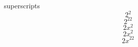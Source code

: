 \documentclass[11pt]{article}
\begin{document}
superscripts
$$ 2^2$$
$$2^{22}$$
$$2x^2$$
$${2x}^2$$
$${2x}^{22}$$
\end{document}
